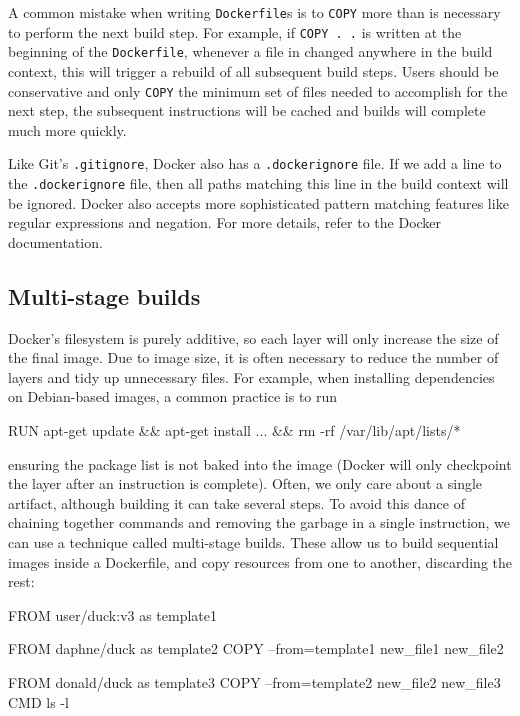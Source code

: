 \documentclass[12pt,initial,twoside,maitrise]{dms}
\def\inline{\lstinline[basicstyle=\ttfamily]}
\numberwithin{equation}{section}
\numberwithin{table}{chapter}
\numberwithin{figure}{chapter}
\begin{document}
A common mistake when writing \inline{Dockerfile}s is to \inline{COPY} more than is necessary to perform the next build step. For example, if \inline{COPY . .} is written at the beginning of the \inline{Dockerfile}, whenever a file in changed anywhere in the build context, this will trigger a rebuild of all subsequent build steps. Users should be conservative and only \inline{COPY} the minimum set of files needed to accomplish for the next step, the subsequent instructions will be cached and builds will complete much more quickly.

Like Git’s \inline{.gitignore}, Docker also has a \inline{.dockerignore} file. If we add a line to the \inline{.dockerignore} file, then all paths matching this line in the build context will be ignored. Docker also accepts more sophisticated pattern matching features like regular expressions and negation. For more details, refer to the Docker documentation.

\subsection{Multi-stage builds}

Docker’s filesystem is purely additive, so each layer will only increase the size of the final image. Due to image size, it is often necessary to reduce the number of layers and tidy up unnecessary files. For example, when installing dependencies on Debian-based images, a common practice is to run

\begin{filelisting}
RUN apt-get update && apt-get install ... && rm -rf /var/lib/apt/lists/*
\end{filelisting}

ensuring the package list is not baked into the image (Docker will only checkpoint the layer after an instruction is complete). Often, we only care about a single artifact, although building it can take several steps. To avoid this dance of chaining together commands and removing the garbage in a single instruction, we can use a technique called multi-stage builds. These allow us to build sequential images inside a Dockerfile, and copy resources from one to another, discarding the rest:

\begin{filelisting}
FROM user/duck:v3 as template1

FROM daphne/duck as template2
COPY --from=template1 new_file1 new_file2

FROM donald/duck as template3
COPY --from=template2 new_file2 new_file3
CMD ls -l
\end{filelisting}
\end{document}
